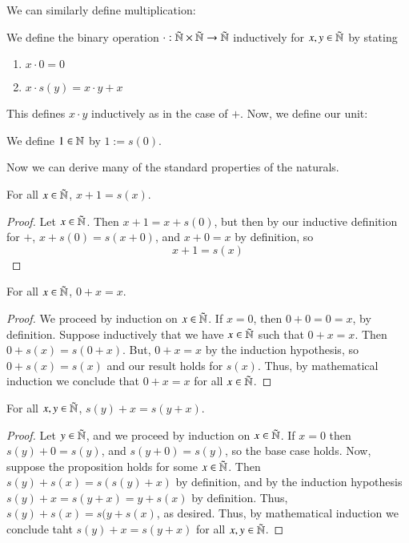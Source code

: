 We can similarly define multiplication:

\begin{definition}
    We define the binary operation $\cdot:\tilde{\mathbb N}\times\tilde{\mathbb N}\rightarrow\tilde{\mathbb N}$ inductively for $x,y \in \tilde{\mathbb N}$ by stating \begin{enumerate}
        \item $x \cdot 0 = 0$ 
        \item $x \cdot s(y) = x\cdot y + x$ 
    \end{enumerate}
\end{definition}

This defines $x\cdot y$ inductively as in the case of $+$. Now, we define our unit:
\begin{definition}
    We define $1 \in \mathbb N$ by $1 := s(0)$.
\end{definition}

Now we can derive many of the standard properties of the naturals.

\begin{proposition}\label{prop:1.1.1}
    For all $x \in \tilde{\mathbb N}$, $x+1 = s(x)$.
\end{proposition}
\begin{proof}
    Let $x \in \tilde{\mathbb N}$. Then $x + 1 = x+s(0)$, but then by our inductive definition for $+$, $x+s(0) = s(x+0)$, and $x+0 = x$ by definition, so $$x+1 = s(x)$$
\end{proof}

\begin{proposition}\label{prop:1.1.2}
    For all $x \in \tilde{\mathbb N}$, $0+x = x$.
\end{proposition}
\begin{proof}
    We proceed by induction on $x \in \tilde{\mathbb N}$. If $x = 0$, then $0 + 0 = 0 = x$, by definition. Suppose inductively that we have $x \in \tilde{\mathbb N}$ such that $0+x=x$. Then $0+s(x) = s(0+x)$. But, $0+x = x$ by the induction hypothesis, so $0+s(x) = s(x)$ and our result holds for $s(x)$. Thus, by mathematical induction we conclude that $0+x = x$ for all $x \in \tilde{\mathbb N}$.
\end{proof}

\begin{proposition}\label{prop:1.1.3}
    For all $x,y \in \tilde{\mathbb N}$, $s(y) + x = s(y+x)$.
\end{proposition}
\begin{proof}
    Let $y \in \tilde{\mathbb N}$, and we proceed by induction on $x \in \tilde{\mathbb N}$. If $x = 0$ then $s(y)+0 = s(y)$, and $s(y+0) = s(y)$, so the base case holds. Now, suppose the proposition holds for some $x \in \tilde{\mathbb N}$. Then $s(y) + s(x) = s(s(y) + x)$ by definition, and by the induction hypothesis $s(y) + x = s(y+x) = y+s(x)$ by definition. Thus, $s(y)+s(x) = s(y+s(x)$, as desired. Thus, by mathematical induction we conclude taht $s(y) + x = s(y+x)$ for all $x,y \in \tilde{\mathbb N}$.
\end{proof}

